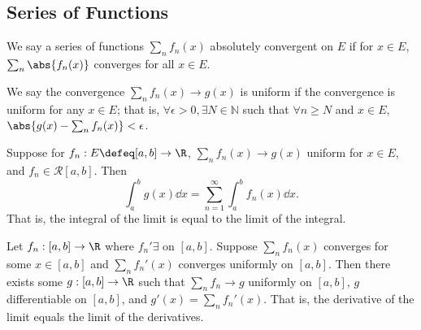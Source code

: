 \subsection{Series of Functions}
\begin{definition}[Convergence]
    We say a series of functions $\sum_n f_n(x)$ absolutely convergent on $E$ if for $x \in E$, $\sum_n \abs{f_n(x)}$ converges for all $x \in E$.

    We say the convergence $\sum_n f_n(x) \to g(x)$ is uniform if the convergence is uniform for any $x \in E$; that is, $\forall \epsilon > 0, \exists N \in \mathbb{N}$ such that $\forall n \geq N$ and $x \in E$, $\abs{g(x) - \sum_n f_n(x)} < \epsilon$.
\end{definition}

\begin{proposition}
    Suppose for $f_n : E \defeq [a, b] \to \R$, $\sum_n f_n(x) \to g(x)$ uniform for $x \in E$, and $f_n \in \mathcal{R}[a, b]$. Then \[
    \int_a^b g(x) \dd{x} = \sum_{n=1}^\infty \int_a^b f_n(x) \dd{x}.    
    \]
    That is, the integral of the limit is equal to the limit of the integral.
\end{proposition}

\begin{proposition}
    Let $f_n :[ a, b] \to \R$ where $f_n' \exists$ on $[a, b]$. Suppose $\sum_n f_n(x)$ converges for some $x \in [a, b]$ and $\sum_n f_n'(x)$ converges uniformly on $[a, b]$. Then there exists some $g : [a, b] \to \R$ such that $\sum_n f_n \to g$ uniformly on $[a, b]$, $g$ differentiable on $[a, b]$, and $g'(x) = \sum_n f_n'(x)$. That is, the derivative of the limit equals the limit of the derivatives.
\end{proposition}